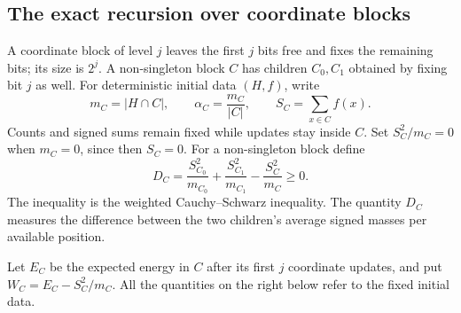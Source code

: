 \subsection{The exact recursion over coordinate blocks}
A coordinate block of level $j$ leaves the first $j$ bits free and
fixes the remaining bits; its size is $2^j$.  A non-singleton block
$C$ has children $C_0,C_1$ obtained by fixing bit $j$ as well.  For
deterministic initial data $(H,f)$, write
\[
 m_C=|H\cap C|,\qquad \alpha_C=\frac{m_C}{|C|},\qquad
 S_C=\sum_{x\in C}f(x).
\]
Counts and signed sums remain fixed while updates stay inside $C$.
Set $S_C^2/m_C=0$ when $m_C=0$, since then $S_C=0$.  For a
non-singleton block define
\begin{equation}\label{prefix:detail}
 D_C=\frac{S_{C_0}^2}{m_{C_0}}+
     \frac{S_{C_1}^2}{m_{C_1}}-\frac{S_C^2}{m_C}\ge0.
\end{equation}
The inequality is the weighted Cauchy--Schwarz inequality.  The quantity
$D_C$ measures the difference between the two children's average signed
masses per available position.

Let $E_C$ be the expected energy in $C$ after its first $j$ coordinate
updates, and put $W_C=E_C-S_C^2/m_C$.  All the quantities on the
right below refer to the fixed initial data.

